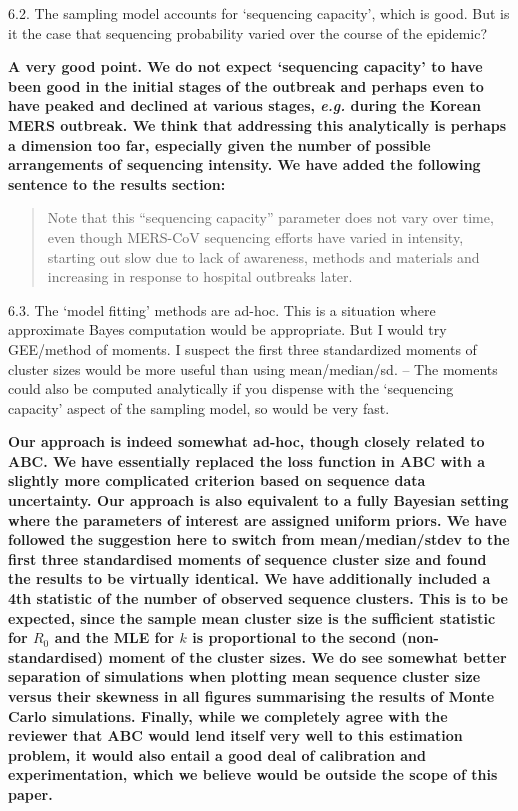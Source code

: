 \documentclass[11pt,oneside,letterpaper]{article}
\begin{document}
6.2. The sampling model accounts for `sequencing capacity', which is good. But is it the case that sequencing probability varied over the course of the epidemic?

\textbf{A very good point. We do not expect `sequencing capacity' to have been good in the initial stages of the outbreak and perhaps even to have peaked and declined at various stages, \textit{e.g.} during the Korean MERS outbreak. We think that addressing this analytically is perhaps a dimension too far, especially given the number of possible arrangements of sequencing intensity. We have added the following sentence to the results section:}

\begin{quotation}
Note that this ``sequencing capacity'' parameter does not vary over time, even though MERS-CoV sequencing efforts have varied in intensity, starting out slow due to lack of awareness, methods and materials and increasing in response to hospital outbreaks later.
\end{quotation}

6.3. The `model fitting' methods are ad-hoc. This is a situation where approximate Bayes computation would be appropriate. But I would try GEE/method of moments. I suspect the first three standardized moments of cluster sizes would be more useful than using mean/median/sd. -- The moments could also be computed analytically if you dispense with the `sequencing capacity' aspect of the sampling model, so would be very fast.

\textbf{Our approach is indeed somewhat ad-hoc, though closely related to ABC.
We have essentially replaced the loss function in ABC with a slightly more complicated criterion based on  sequence data uncertainty.
Our approach is also equivalent to a fully Bayesian setting where the parameters of interest are assigned uniform priors.
We have followed the suggestion here to switch from mean/median/stdev to the first three standardised moments of sequence cluster size and found the results to be virtually identical.
We have additionally included a 4th statistic of the number of observed sequence clusters.
This is to be expected, since the sample mean cluster size is the sufficient statistic for $R_0$ and the MLE for $k$ is proportional to the second (non-standardised) moment of the cluster sizes.
We do see somewhat better separation of simulations when plotting mean sequence cluster size versus their skewness in all figures summarising the results of Monte Carlo simulations.
Finally, while we completely agree with the reviewer that ABC would lend itself very well to this estimation problem, it would also entail a good deal of calibration and experimentation, which we believe would be outside the scope of this paper. %
}
\end{document}
